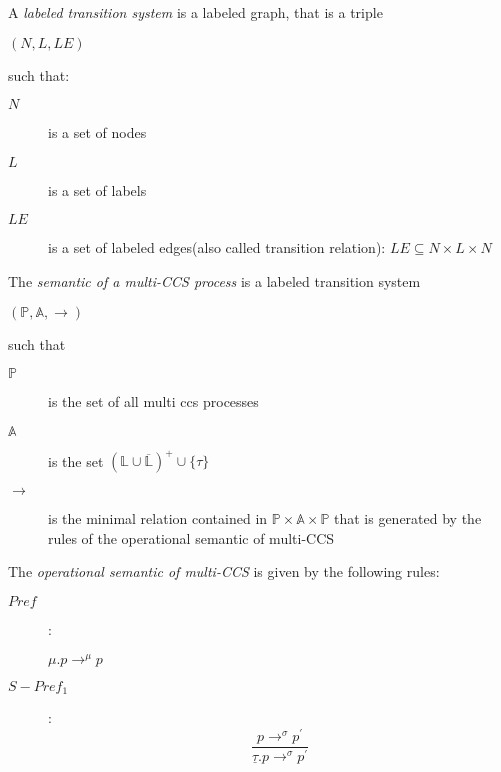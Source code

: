 \begin{definition}
\label{labeled transition system} 
A \emph{labeled transition system} is a labeled graph, that is a triple 
\begin{center}
  $(N, L, LE)$ 
\end{center}
such that:
\begin{description}
  \item[$N$] is a set of nodes
  \item[$L$] is a set of labels
  \item[$LE$] is a set of labeled edges(also called transition relation): $LE\subseteq N\times L\times N$
\end{description}
\end{definition}
\begin{definition}
The \emph{semantic of a multi-CCS process} is a labeled transition system 
\begin{center}
  $(\mathbb{P}, \mathbb{A}, \rightarrow)$
\end{center}
such that
\begin{description}
  \item[$\mathbb{P}$] is the set of all multi ccs processes
  \item[$\mathbb{A}$] is the set $(\mathbb{L}\cup \overline{\mathbb{L}})^{+}\cup \{\tau\}$
  \item[$\rightarrow$] is the minimal relation contained in $\mathbb{P}\times \mathbb{A} \times \mathbb{P}$ that is generated by the rules of the operational semantic of multi-CCS
\end{description}
\end{definition}

\begin{definition}
\label{operational semantic of multi-CCS}
The \emph{operational semantic of multi-CCS} is given by the following rules:
\begin{description}
  \item[$Pref$]:
    \begin{center}
      $\mu.p {\rightarrow}^{\mu} p $
    \end{center}
  \item[$S-Pref_{1}$]:
    \[
      \frac{p\rightarrow^{\sigma}p^{'}}{\underline{\tau}.p\rightarrow^{\sigma}p^{'}}
    \]
\end{description}

\end{definition}


